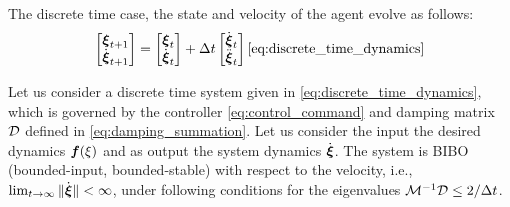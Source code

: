  The discrete time case, the state and velocity of the agent evolve as follows:
\begin{equation}
	\begin{bmatrix}
	 \boldsymbol{\xi}_{t+1} \\ \dot{\boldsymbol{\xi}}_{t+1}
	\end{bmatrix}
	=
	\begin{bmatrix}
	 \boldsymbol{\xi}_{t} \\ \dot{\boldsymbol{\xi}}_{t}
	\end{bmatrix}
	+ 
	\Delta t 
	\begin{bmatrix}
		\dot{\boldsymbol{\xi}}_{t} \\ \ddot{\boldsymbol{\xi}}_t 
	\end{bmatrix}
	\eqref{eq:discrete_time_dynamics}
\end{equation}

\begin{lemma}
	Let us consider a discrete time system given in \eqref{eq:discrete_time_dynamics}, which is governed by the controller \eqref{eq:control_command} and damping matrix $\mathcal{D}$ defined in \eqref{eq:damping_summation}.
	Let us consider the input the desired dynamics $\boldsymbol{f}(\xi)$ and as output the system dynamics $\dot{\boldsymbol{\xi}}$. 
	The system is BIBO (bounded-input, bounded-stable) with respect to the velocity, i.e., $\lim_{t \rightarrow \infty} \| \dot{\boldsymbol{\xi}} \| < \infty$, under following conditions for the eigenvalues $\mathcal{M}^{-1} \mathcal{D} \leq 2 / \Delta t$.
\end{lemma}


